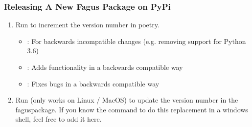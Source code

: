 \documentclass[a4paper,10pt,english]{sphinxmanual}
\begin{document}
\subsubsection{Releasing A New Fagus Package on PyPi}
\label{\detokenize{CONTRIBUTING:releasing-a-new-fagus-package-on-pypi}}\begin{enumerate}
%
\item {}
\sphinxAtStartPar
Run to increment the version number in poetry.
\begin{itemize}
\item {}
\sphinxAtStartPar
{}: For backwards incompatible changes (e.g. removing support for Python 3.6)

\item {}
\sphinxAtStartPar
{}: Adds functionality in a backwards compatible way

\item {}
\sphinxAtStartPar
{}: Fixes bugs in a backwards compatible way

\end{itemize}

\item {}
\sphinxAtStartPar
Run  (only works on Linux / MacOS) to update the version number in the fagus\sphinxhyphen{}package. If you know the command to do this replacement in a windows shell, feel free to add it here.

\end{enumerate}


\renewcommand{\indexname}{Python Module Index}
\begin{sphinxtheindex}
\let\bigletter\sphinxstyleindexlettergroup
\bigletter{f}
\item\relax{}
\item\relax{}
\item\relax{}
\item\relax{}
\item\relax{}
\end{sphinxtheindex}

\renewcommand{\indexname}{Index}
\printindex
\end{document}

